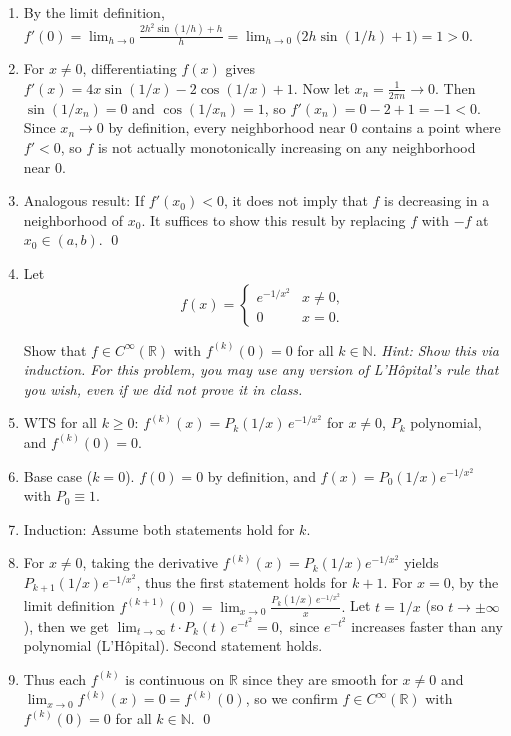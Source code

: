 \documentclass[12pt]{article}
\newcommand{\R}{\mathbb{R}}
\newcommand{\N}{\mathbb{N}}
\begin{document}
\begin{enumerate}
\item[] By the limit definition,
$f'(0) = \lim_{h \to 0} \frac{2h^2 \sin(1/h) + h}{h} = \lim_{h \to 0} \bigl(2h \sin(1/h) + 1\bigr) = 1 > 0.$
 
\item[] For $x \neq 0$, differentiating $f(x)$ gives $f'(x) = 4x \sin(1/x) - 2\cos(1/x) + 1.$ Now let $x_n = \frac{1}{2\pi n} \to 0$. Then $\sin(1/x_n) = 0$ and $\cos(1/x_n) = 1$, so $f'(x_n) = 0 - 2 + 1 = -1 < 0.$ Since $x_n \to 0$ by definition, every neighborhood near $0$ contains a point where $f' < 0$, so $f$ is not actually monotonically increasing on any neighborhood near $0$.
 
\item[] Analogous result: If $f'(x_0) < 0$, it does not imply that $f$ is decreasing in a neighborhood of $x_0$. It suffices to show this result by replacing $f$ with $-f$ at $x_0 \in (a,b)$. \qed

\item Let \[f(x) = \begin{cases}
e^{-1/x^2} & x \neq 0, \\ 0 & x = 0.
\end{cases}\]

Show that $f \in C^\infty(\R)$ with $f^{(k)}(0) = 0$ for all $k \in \N$. \textit{Hint: Show this via induction. For this problem, you may use any version of L'H\^opital's rule that you wish, even if we did not prove it in class.}
\item[] WTS for all $k \ge 0$: $f^{(k)}(x) = P_k(1/x)\, e^{-1/x^2}$ for $x \neq 0$, $P_k$ polynomial, and $f^{(k)}(0) = 0$.
 
\item[] Base case ($k = 0$). $f(0) = 0$ by definition, and $f(x) = P_0(1/x) e^{-1/x^2}$ with $P_0 \equiv 1$.
 
\item[] Induction: Assume both statements hold for $k$. 
\item[] For $x \neq 0$, taking the derivative $f^{(k)}(x) = P_k(1/x) e^{-1/x^2}$ yields $P_{k+1}(1/x) e^{-1/x^2}$, thus the first statement holds for $k+1$. For $x=0$, by the limit definition
$f^{(k+1)}(0) = \lim_{x \to 0} \frac{P_k(1/x)\, e^{-1/x^2}}{x}.$
Let $t = 1/x$ (so $t \to \pm\infty$), then we get $\lim_{t \to \infty} t \cdot P_k(t)\, e^{-t^2} = 0,$ since $e^{-t^2}$ increases faster than any polynomial (L'H\^{o}pital). Second statement holds.
 
\item[] Thus each $f^{(k)}$ is continuous on $\R$ since they are smooth for $x \neq 0$ and $\lim_{x \to 0} f^{(k)}(x) = 0 = f^{(k)}(0)$, so we confirm $f \in C^\infty(\R)$ with $f^{(k)}(0) = 0$ for all $k \in \N$. \qed

\end{enumerate}
\end{document}
